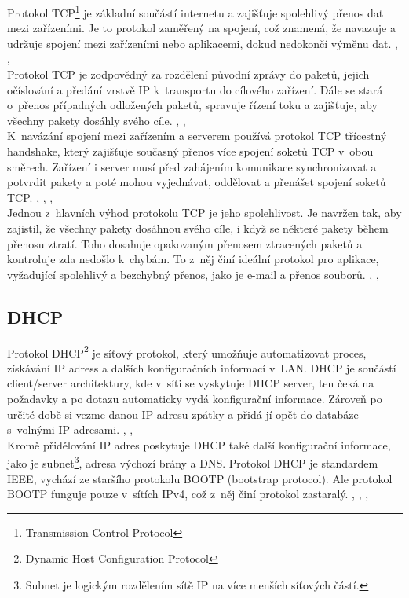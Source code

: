 \documentclass[12pt]{report}			%
\begin{document}
				
Protokol TCP\footnote{Transmission Control Protocol} je základní součástí internetu a zajišťuje spolehlivý přenos dat mezi zařízeními. Je to protokol zaměřený na spojení, což znamená, že navazuje a udržuje spojení mezi zařízeními nebo aplikacemi, dokud nedokončí výměnu dat. \cite{Pruvodce}, \cite{TCP}, \cite{TCP1}
\\
Protokol TCP je zodpovědný za rozdělení původní zprávy do paketů, jejich očíslování a předání vrstvě IP k~transportu do cílového zařízení. Dále se stará o~přenos případných odložených paketů, spravuje řízení toku a zajišťuje, aby všechny pakety dosáhly svého cíle.  \cite{Pruvodce}, \cite{TCP}, \cite{TCP1}
\\
K~navázání spojení mezi zařízením a serverem používá protokol TCP třícestný handshake, který zajišťuje současný přenos více spojení soketů TCP v~obou směrech. Zařízení i server musí před zahájením komunikace synchronizovat a potvrdit pakety a poté mohou vyjednávat, oddělovat a přenášet spojení soketů TCP. \cite{Pruvodce}, \cite{TCP}, \cite{TCP1}, \cite{TCP2}
\\
Jednou z~hlavních výhod protokolu TCP je jeho spolehlivost. Je navržen tak, aby zajistil, že všechny pakety dosáhnou svého cíle, i když se některé pakety během přenosu ztratí. Toho dosahuje opakovaným přenosem ztracených paketů a kontroluje zda nedošlo k~chybám. To z~něj činí ideální protokol pro aplikace, vyžadující spolehlivý a bezchybný přenos, jako je e-mail a přenos souborů. \cite{Pruvodce}, \cite{TCP}, \cite{TCP1}



				\subsection{DHCP}
				
				
Protokol DHCP\footnote{Dynamic Host Configuration Protocol} je síťový protokol, který umožňuje automatizovat proces, získávání IP adress a dalších konfiguračních informací v~LAN. DHCP je součástí client/server architektury, kde v~síti se vyskytuje DHCP server, ten čeká na požadavky a po dotazu automaticky vydá konfigurační informace. Zároveň po určité době si vezme danou IP adresu zpátky a přidá jí opět do databáze s~volnými IP adresami. \cite{DHCP1}, \cite{DHCP2}, \cite{DHCP4}
\\
Kromě přidělování IP adres poskytuje DHCP také další  konfigurační informace, jako je subnet\footnote{Subnet je logickým rozdělením sítě IP na více menších síťových částí.}, adresa výchozí brány a DNS. Protokol DHCP je standardem IEEE, vychází ze staršího protokolu BOOTP (bootstrap protocol). Ale protokol BOOTP funguje pouze v~sítích IPv4, což z~něj činí protokol zastaralý. \cite{DHCP1}, \cite{DHCP2}, \cite{DHCP3} ,\cite{DHCP4}
\end{document}
